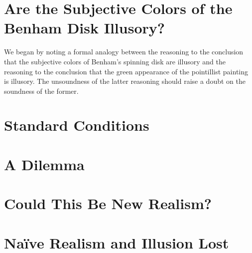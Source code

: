 \documentclass[12pt]{article}
\begin{document}


\section{Are the Subjective Colors of the Benham Disk Illusory?}\label{sec:are_the_subjective_colors_of_the_benham_disk_illusory_} %

We began by noting a formal analogy between the reasoning to the conclusion that the subjective colors of Benham's spinning disk are illusory and the reasoning to the conclusion that the green appearance of the pointillist painting is illusory. The unsoundness of the latter reasoning should raise a doubt on the soundness of the former.


\section{Standard Conditions}\label{sec:standard_conditions} %




\section{A Dilemma}\label{sec:a_dilemma} %




\section{Could This Be New Realism?}\label{sec:could_this_be_new_realism_} %




\section{Naïve Realism and Illusion Lost}\label{sec:naïve_realism_and_illusion_lost} %




 
 
\end{document}
